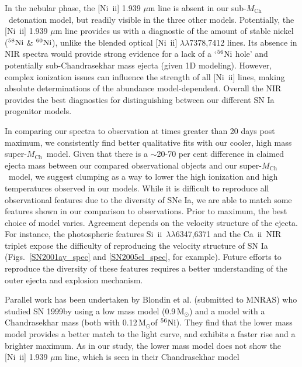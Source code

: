 \documentclass[useAMS,usenatbib,useasmath]{mnras}
\newcommand{\Mch}{\hbox{$M_{\text{Ch}}$}}
\newcommand{\Msun}{\hbox{M$_\odot$}}
\newcommand{\elem}[2][default]{$^{#1}{\rm #2}$}
\def\isoni{$^{56}{\rm Ni}$}
\newcommand{\caii}{\mbox{Ca~{\sc ii}}}
\newcommand{\skii}{\mbox{Si~{\sc ii}}}
\newcommand{\nkii}{\mbox{Ni~{\sc ii}}}
\newcommand{\lb}{$\lambda$}
\def\figs{Figs.}
\begin{document}
In the nebular phase, the  [\nkii] 1.939 $\mu$m line is absent in our sub-\Mch\ detonation model, but readily visible in the three other models. Potentially, the [\nkii] 1.939 $\mu$m line provides us with a diagnostic of the amount of stable nickel (\elem[58]{Ni} \& \elem[60]{Ni}), unlike the blended optical [\nkii] \lb\lb7378,7412 lines. Its absence in NIR spectra would provide strong evidence for a lack of a `\elem[56]{Ni} hole' and potentially sub-Chandrasekhar mass ejecta (given 1D modeling). However, complex ionization issues can influence the strength of all [\nkii] lines, making absolute determinations of the abundance model-dependent. Overall the NIR provides the best diagnostics for distinguishing between our different SN Ia progenitor models. 

In comparing our spectra to observation at times greater than 20 days post maximum, we consistently find better qualitative fits with our cooler, high mass super-\Mch\ model. Given that there is a $\sim$20-70 per cent difference in claimed ejecta mass between our compared observational objects and our super-\Mch\ model, we suggest clumping as a way to lower the high ionization and high temperatures observed in our models. 
While it is difficult to reproduce all observational features due to the diversity of SNe Ia, we are able to match some features shown in our comparison to observations. Prior to maximum, the best choice of model varies. Agreement depends on the velocity structure of the ejecta. For instance, the photospheric features \skii\ \lb\lb6347,6371 and the \caii\ NIR triplet expose the difficulty of reproducing the velocity structure of SN Ia (\figs~\ref{SN2001ay_spec} and \ref{SN2005el_spec}, for example). Future efforts to reproduce the diversity of these features requires a better understanding of the outer ejecta and explosion mechanism.

Parallel work has been undertaken by Blondin et al. (submitted to MNRAS) who studied SN 1999by using a low mass  model (0.9\,\Msun) and a model with a  Chandrasekhar mass (both with 0.12\,\Msun of \isoni). They find that the lower mass model provides a better match to the light curve, and exhibits a faster rise and a brighter maximum. As in our study, the lower mass model does not show the [\nkii] 1.939 $\mu$m line, which is seen in their Chandrasekhar model
\end{document}
